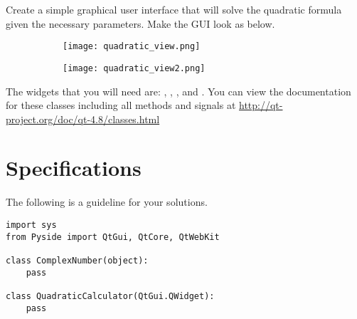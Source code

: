 \begin{problem}
Create a simple graphical user interface that will solve the quadratic formula given the necessary parameters.
Make the GUI look as below.
\begin{figure}[H]
\centering
\begin{subfigure}[b]{.49\textwidth}
\texttt{[image: quadratic\_view.png]}
\end{subfigure}
\begin{subfigure}[b]{.49\textwidth}
\texttt{[image: quadratic\_view2.png]}
\end{subfigure}
\end{figure}
The widgets that you will need are: , , , and .
You can view the documentation for these classes including all methods and signals at \url{http://qt-project.org/doc/qt-4.8/classes.html}
\end{problem}

\section*{Specifications}

The following is a guideline for your solutions.
\begin{lstlisting}
import sys
from Pyside import QtGui, QtCore, QtWebKit

class ComplexNumber(object):
	pass
	
class QuadraticCalculator(QtGui.QWidget):
	pass
\end{lstlisting}


